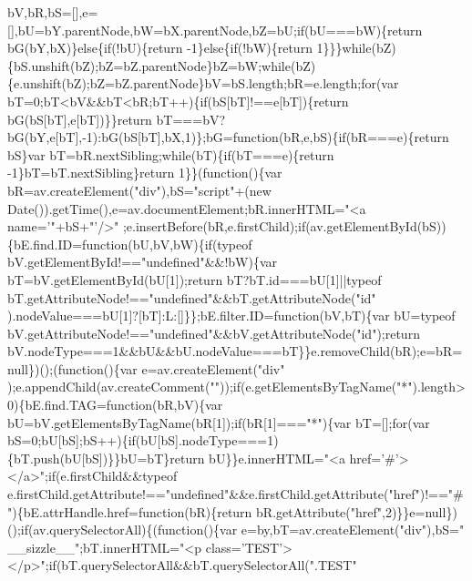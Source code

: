 \begin{DoxyCode}
{       bV,bR,bS=[],e=[],bU=bY.parentNode,bW=bX.parentNode,bZ=bU;if(bU===bW)\{return bG(bY,bX)\}else\{if(!bU)\{return -1\}else\{if(!bW)\{return
       1\}\}\}while(bZ)\{bS.unshift(bZ);bZ=bZ.parentNode\}bZ=bW;while(bZ)\{e.unshift(bZ);bZ=bZ.parentNode\}bV=bS.length;bR=e.length;for(var
       bT=0;bT<bV&&bT<bR;bT++)\{if(bS[bT]!==e[bT])\{return bG(bS[bT],e[bT])\}\}return
       bT===bV?bG(bY,e[bT],-1):bG(bS[bT],bX,1)\};bG=function(bR,e,bS)\{if(bR===e)\{return bS\}var bT=bR.nextSibling;while(bT)\{if(bT===e)\{return -1\}bT=bT.nextSibling\}return
       1\}\}(function()\{var bR=av.createElement("}div\textcolor{stringliteral}{"),bS="}script\textcolor{stringliteral}{"+(new Date()).getTime(),e=av.documentElement;bR.innerHTML="}<a 
      name=\textcolor{stringliteral}{'"+bS+"'}/>\textcolor{stringliteral}{"
      ;e.insertBefore(bR,e.firstChild);if(av.getElementById(bS))\{bE.find.ID=function(bU,bV,bW)\{if(typeof bV.getElementById!=="}undefined\textcolor{stringliteral}{"&&!bW)\{var bT=bV.getElementById(bU[1]);return
       bT?bT.id===bU[1]||typeof bT.getAttributeNode!=="}undefined\textcolor{stringliteral}{"&&bT.getAttributeNode("}\textcolor{keywordtype}{id}\textcolor{stringliteral}{"
      ).nodeValue===bU[1]?[bT]:L:[]\}\};bE.filter.ID=function(bV,bT)\{var bU=typeof bV.getAttributeNode!=="}undefined\textcolor{stringliteral}{"&&bV.getAttributeNode("}\textcolor{keywordtype}{id}\textcolor{stringliteral}{");return
       bV.nodeType===1&&bU&&bU.nodeValue===bT\}\}e.removeChild(bR);e=bR=null\})();(function()\{var e=av.createElement("}div\textcolor{stringliteral}{"
      );e.appendChild(av.createComment("}\textcolor{stringliteral}{"));if(e.getElementsByTagName("}*\textcolor{stringliteral}{").length>0)\{bE.find.TAG=function(bR,bV)\{var
       bU=bV.getElementsByTagName(bR[1]);if(bR[1]==="}*\textcolor{stringliteral}{")\{var bT=[];for(var
       bS=0;bU[bS];bS++)\{if(bU[bS].nodeType===1)\{bT.push(bU[bS])\}\}bU=bT\}return bU\}\}e.innerHTML="}<a href=\textcolor{charliteral}{'#'}></a>\textcolor{stringliteral}{";if(e.firstChild&&typeof
       e.firstChild.getAttribute!=="}undefined\textcolor{stringliteral}{"&&e.firstChild.getAttribute("}href\textcolor{stringliteral}{")!=="}#\textcolor{stringliteral}{")\{bE.attrHandle.href=function(bR)\{return
       bR.getAttribute("}href\textcolor{stringliteral}{",2)\}\}e=null\})();if(av.querySelectorAll)\{(function()\{var e=by,bT=av.createElement("}div\textcolor{stringliteral}{"),bS="}
      \_\_sizzle\_\_\textcolor{stringliteral}{";bT.innerHTML="}<p \textcolor{keyword}{class}=\textcolor{stringliteral}{'TEST'}></p>\textcolor{stringliteral}{";if(bT.querySelectorAll&&bT.querySelectorAll("}.TEST\textcolor{stringliteral}{"
}
\end{DoxyCode}
